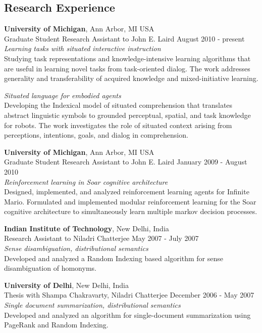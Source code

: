 \documentclass[margin,line,11pt]{res}
\begin{document}
\begin{resume}
\section{\sc Research Experience}
{\bf University of Michigan}, Ann Arbor, MI USA \\ {Graduate Student
  Research Assistant} to John E. Laird \hfill August 2010 -
present\\ \emph{Learning tasks with situated interactive instruction}
\\ Studying task representations and knowledge-intensive learning
algorithms that are useful in learning novel tasks from task-oriented
dialog. The work addresses generality and transferability of acquired
knowledge and mixed-initiative learning. 

\emph{Situated language for embodied agents}\\ Developing the
Indexical model of situated comprehension that translates abstract
linguistic symbols to grounded perceptual, spatial, and task knowledge
for robots. The work investigates the role of situated context arising
from perceptions, intentions, goals, and dialog in comprehension.


{\bf University of Michigan}, Ann Arbor, MI USA \\ {Graduate Student
  Research Assistant} to John E. Laird \hfill January 2009 - August
2010\\ \emph{Reinforcement learning in Soar cognitive
  architecture}\\ Designed, implemented, and analyzed reinforcement
learning agents for Infinite Mario. Formulated and implemented modular
reinforcement learning for the Soar cognitive architecture to
simultaneously learn multiple markov decision processes.

\pagebreak

{\bf Indian Institute of Technology}, New Delhi, India \\
{Research Assistant} to Niladri Chatterjee \hfill May 2007 - July 2007\\
\emph{Sense disambiguation, distributional semantics}\\
Developed and analyzed a Random Indexing based algorithm for sense disambiguation of homonyms.

{\bf University of Delhi}, New Delhi, India \\
{Thesis} with Shampa Chakravarty, Niladri Chatterjee \hfill December 2006 - May 2007\\
\emph{Single document summarization, distributional semantics}\\
Developed and analyzed an algorithm for single-document summarization using PageRank and Random Indexing.



\end{resume}
\end{document}
